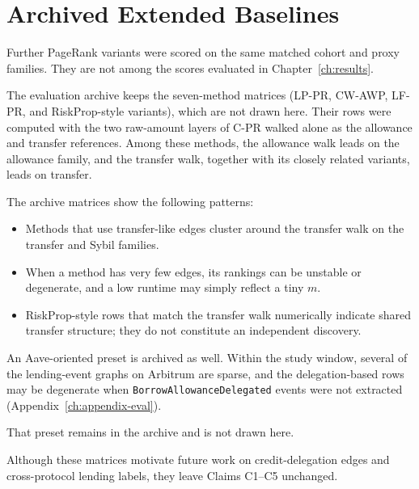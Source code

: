 \section{Archived Extended Baselines}
\label{ch:appendix-archive}

Further PageRank variants were scored on the same matched cohort and proxy families. They are not among the scores evaluated in Chapter~\ref{ch:results}.


The evaluation archive keeps the seven-method matrices (LP-PR, CW-AWP, LF-PR, and RiskProp-style variants), which are not drawn here. Their rows were computed with the two raw-amount layers of C-PR walked alone as the allowance and transfer references. Among these methods, the allowance walk leads on the allowance family, and the transfer walk, together with its closely related variants, leads on transfer.

The archive matrices show the following patterns:

\begin{itemize}
\item Methods that use transfer-like edges cluster around the transfer walk on the transfer and Sybil families.
\item When a method has very few edges, its rankings can be unstable or degenerate, and a low runtime may simply reflect a tiny $m$.
\item RiskProp-style rows that match the transfer walk numerically indicate shared transfer structure; they do not constitute an independent discovery.
\end{itemize}


An Aave-oriented preset is archived as well. Within the study window, several of the lending-event graphs on Arbitrum are sparse, and the delegation-based rows may be degenerate when \texttt{BorrowAllowanceDelegated} events were not extracted (Appendix~\ref{ch:appendix-eval}).

That preset remains in the archive and is not drawn here.

Although these matrices motivate future work on credit-delegation edges and cross-protocol lending labels, they leave Claims C1--C5 unchanged.


